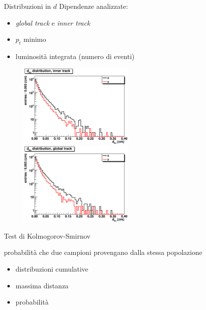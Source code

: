 \documentclass[italian]{beamer}
\begin{document}
\begin{frame}{Distribuzioni in $d$}
Dipendenze analizzate:
\begin{itemize}
    \item \emph{global track} e \emph{inner track}
    \item $p_t$ minimo
    \item luminosità integrata (numero di eventi)
\end{itemize}
\begin{figure}[h]
    \includegraphics[width=0.5\textwidth]{crea_istogrammi/d_lin_inner.eps}
    \includegraphics[width=0.5\textwidth]{crea_istogrammi/d_lin_global.eps}
\end{figure}
\end{frame}

\begin{frame}{Test di Kolmogorov-Smirnov}
    \begin{block}{}
        probabilità che due campioni provengano dalla stessa popolazione
    \end{block}
\begin{itemize}
    \item distribuzioni cumulative
    \item massima distanza
    \item probabilità
\end{itemize}
\end{frame}
\end{document}
